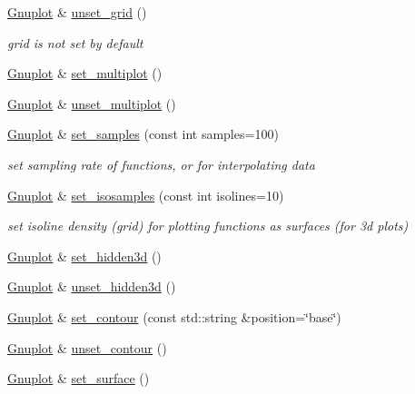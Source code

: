 \begin{DoxyCompactItemize}
\hyperlink{class_gnuplot}{Gnuplot} \& \hyperlink{class_gnuplot_a53183e1487bc6977f0d46bf75d19b4d3}{unset\+\_\+grid} ()
\begin{DoxyCompactList}\small\item\em grid is not set by default \end{DoxyCompactList}\item 
\hyperlink{class_gnuplot}{Gnuplot} \& \hyperlink{class_gnuplot_a67efc4d4dc46b6100d14ba2f7366ef11}{set\+\_\+multiplot} ()
\item 
\hyperlink{class_gnuplot}{Gnuplot} \& \hyperlink{class_gnuplot_aad76cdec16cfb5fdf82f45ed2786f4d8}{unset\+\_\+multiplot} ()
\item 
\mbox{\label{class_gnuplot_a671cbe7b18a267ea59f532c83a0035f6}} 
\hyperlink{class_gnuplot}{Gnuplot} \& \hyperlink{class_gnuplot_a671cbe7b18a267ea59f532c83a0035f6}{set\+\_\+samples} (const int samples=100)
\begin{DoxyCompactList}\small\item\em set sampling rate of functions, or for interpolating data \end{DoxyCompactList}\item 
\mbox{\label{class_gnuplot_ab810fa4c02fb49ae197786c305b78702}} 
\hyperlink{class_gnuplot}{Gnuplot} \& \hyperlink{class_gnuplot_ab810fa4c02fb49ae197786c305b78702}{set\+\_\+isosamples} (const int isolines=10)
\begin{DoxyCompactList}\small\item\em set isoline density (grid) for plotting functions as surfaces (for 3d plots) \end{DoxyCompactList}\item 
\hyperlink{class_gnuplot}{Gnuplot} \& \hyperlink{class_gnuplot_a891f9800705eddc3f73886f265c009b8}{set\+\_\+hidden3d} ()
\item 
\hyperlink{class_gnuplot}{Gnuplot} \& \hyperlink{class_gnuplot_ab8688182047f746090e1e5f2a8c11c9e}{unset\+\_\+hidden3d} ()
\item 
\hyperlink{class_gnuplot}{Gnuplot} \& \hyperlink{class_gnuplot_af845efc728a90d7e10de764eff0b2423}{set\+\_\+contour} (const std\+::string \&position=\char`\"{}base\char`\"{})
\item 
\hyperlink{class_gnuplot}{Gnuplot} \& \hyperlink{class_gnuplot_a0b8522cb81e46dd4f5a22b7b48f977b1}{unset\+\_\+contour} ()
\item 
\hyperlink{class_gnuplot}{Gnuplot} \& \hyperlink{class_gnuplot_a9825bd26500e30ca88404c4807e6607a}{set\+\_\+surface} ()

\end{DoxyCompactItemize}
